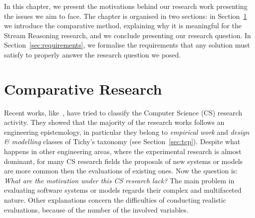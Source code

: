 In this chapter, we present the motivations behind our research work presenting the issues we aim to face. The chapter is organised in two sections: in Section~\ref{sec:comparative-research} we introduce the comparative method, explaining why it is meaningful for the Stream Reasoning research, and we conclude presenting our research question. In Section~\ref{sec:requirements}, we formalise the requirements that any solution must satisfy to properly answer the research question we posed.

\section{Comparative Research}\label{sec:comparative-research}

 
Recent works, like~\cite{Wainer:2009:EEC:1518331.1518552,Tichy:1995:EEC:209090.209093}, have tried to classify the Computer Science (CS) research activity. They showed that the majority of the research works follows an engineering epistemology, in particular they belong to \textit{empirical work} and \textit{design \& modelling} classes of Tichy's taxonomy (see Section~\ref{sec:tcp}). Despite what happens in other engineering areas, where the experimental research is almost dominant, for many CS research fields the proposals of new systems or models are more common then the evaluations of existing ones. Now the question is: \textit{What are the motivation under this CS research lack?} The main problem in evaluating software systems or models regards their complex and multifaceted nature. Other explanations concern the difficulties of conducting realistic evaluations, because of the number of the involved variables.

